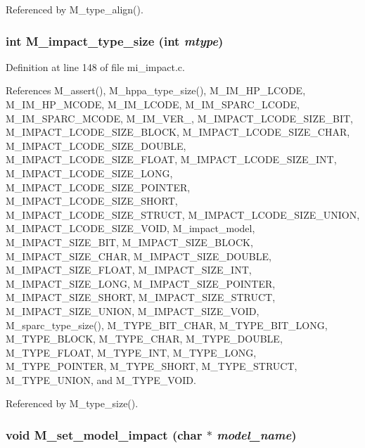 Referenced by M\_\-type\_\-align().
\subsubsection{\setlength{\rightskip}{0pt plus 5cm}int M\_\-impact\_\-type\_\-size (int {\em mtype})}\label{mi__impact_8c_4218c869405187906b9cae1ede7897de}




Definition at line 148 of file mi\_\-impact.c.

References M\_\-assert(), M\_\-hppa\_\-type\_\-size(), M\_\-IM\_\-HP\_\-LCODE, M\_\-IM\_\-HP\_\-MCODE, M\_\-IM\_\-LCODE, M\_\-IM\_\-SPARC\_\-LCODE, M\_\-IM\_\-SPARC\_\-MCODE, M\_\-IM\_\-VER\_, M\_\-IMPACT\_\-LCODE\_\-SIZE\_\-BIT, M\_\-IMPACT\_\-LCODE\_\-SIZE\_\-BLOCK, M\_\-IMPACT\_\-LCODE\_\-SIZE\_\-CHAR, M\_\-IMPACT\_\-LCODE\_\-SIZE\_\-DOUBLE, M\_\-IMPACT\_\-LCODE\_\-SIZE\_\-FLOAT, M\_\-IMPACT\_\-LCODE\_\-SIZE\_\-INT, M\_\-IMPACT\_\-LCODE\_\-SIZE\_\-LONG, M\_\-IMPACT\_\-LCODE\_\-SIZE\_\-POINTER, M\_\-IMPACT\_\-LCODE\_\-SIZE\_\-SHORT, M\_\-IMPACT\_\-LCODE\_\-SIZE\_\-STRUCT, M\_\-IMPACT\_\-LCODE\_\-SIZE\_\-UNION, M\_\-IMPACT\_\-LCODE\_\-SIZE\_\-VOID, M\_\-impact\_\-model, M\_\-IMPACT\_\-SIZE\_\-BIT, M\_\-IMPACT\_\-SIZE\_\-BLOCK, M\_\-IMPACT\_\-SIZE\_\-CHAR, M\_\-IMPACT\_\-SIZE\_\-DOUBLE, M\_\-IMPACT\_\-SIZE\_\-FLOAT, M\_\-IMPACT\_\-SIZE\_\-INT, M\_\-IMPACT\_\-SIZE\_\-LONG, M\_\-IMPACT\_\-SIZE\_\-POINTER, M\_\-IMPACT\_\-SIZE\_\-SHORT, M\_\-IMPACT\_\-SIZE\_\-STRUCT, M\_\-IMPACT\_\-SIZE\_\-UNION, M\_\-IMPACT\_\-SIZE\_\-VOID, M\_\-sparc\_\-type\_\-size(), M\_\-TYPE\_\-BIT\_\-CHAR, M\_\-TYPE\_\-BIT\_\-LONG, M\_\-TYPE\_\-BLOCK, M\_\-TYPE\_\-CHAR, M\_\-TYPE\_\-DOUBLE, M\_\-TYPE\_\-FLOAT, M\_\-TYPE\_\-INT, M\_\-TYPE\_\-LONG, M\_\-TYPE\_\-POINTER, M\_\-TYPE\_\-SHORT, M\_\-TYPE\_\-STRUCT, M\_\-TYPE\_\-UNION, and M\_\-TYPE\_\-VOID.

Referenced by M\_\-type\_\-size().
\subsubsection{\setlength{\rightskip}{0pt plus 5cm}void M\_\-set\_\-model\_\-impact (char $\ast$ {\em model\_\-name})}\label{mi__impact_8c_b53e45240630637ce4d87a4e60338881}





